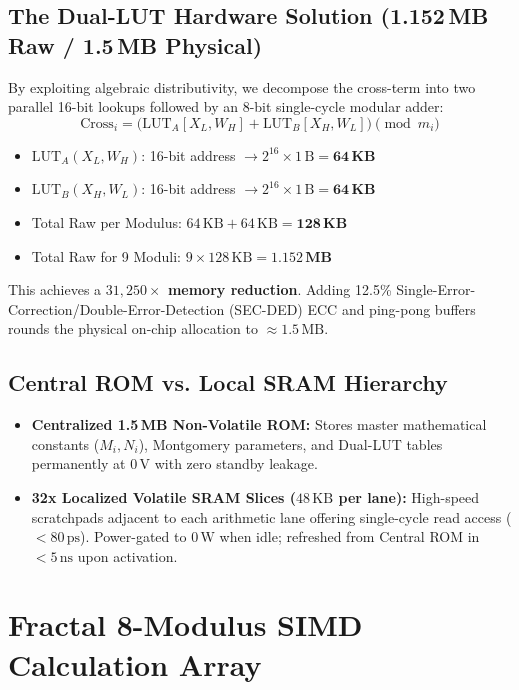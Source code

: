 \documentclass[10pt,journal,compsoc]{IEEEtran}
\begin{document}
\subsection{The Dual-LUT Hardware Solution (1.152\,MB Raw / 1.5\,MB Physical)}
By exploiting algebraic distributivity, we decompose the cross-term into two parallel 16-bit lookups followed by an 8-bit single-cycle modular adder:
\begin{equation}
\text{Cross}_i = \Big( \text{LUT}_A[X_L, W_H] + \text{LUT}_B[X_H, W_L] \Big) \pmod{m_i}
\end{equation}
\begin{itemize}
    \item $\text{LUT}_A(X_L, W_H)$: 16-bit address $\to 2^{16} \times 1\,\text{B} = \mathbf{64\,\text{KB}}$
    \item $\text{LUT}_B(X_H, W_L)$: 16-bit address $\to 2^{16} \times 1\,\text{B} = \mathbf{64\,\text{KB}}$
    \item Total Raw per Modulus: $64\,\text{KB} + 64\,\text{KB} = \mathbf{128\,\text{KB}}$
    \item Total Raw for 9 Moduli: $9 \times 128\,\text{KB} = \mathbf{1.152\,\text{MB}}$
\end{itemize}
This achieves a \textbf{$31,250\times$ memory reduction}. Adding 12.5\% Single-Error-Correction/Double-Error-Detection (SEC-DED) ECC and ping-pong buffers rounds the physical on-chip allocation to \textbf{$\approx 1.5\,\text{MB}$}.

\subsection{Central ROM vs. Local SRAM Hierarchy}
\begin{itemize}
    \item \textbf{Centralized 1.5\,MB Non-Volatile ROM:} Stores master mathematical constants ($M_i, N_i$), Montgomery parameters, and Dual-LUT tables permanently at $0\,\text{V}$ with zero standby leakage.
    \item \textbf{32x Localized Volatile SRAM Slices ($48\,\text{KB}$ per lane):} High-speed scratchpads adjacent to each arithmetic lane offering single-cycle read access ($<80\,\text{ps}$). Power-gated to $0\,\text{W}$ when idle; refreshed from Central ROM in $<5\,\text{ns}$ upon activation.
\end{itemize}

\section{Fractal 8-Modulus SIMD Calculation Array}\label{sec:arithmetic}
\end{document}
